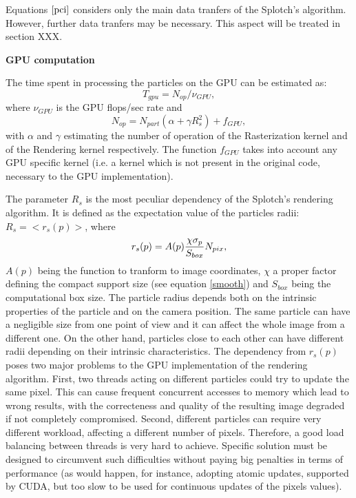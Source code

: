 \documentclass[11pt]{article}
\begin{document}
Equations $\eqref{pci}$ considers only the main data tranfers of
the Splotch's algorithm. However, further data tranfers may be necessary.
This aspect will be treated in section XXX.

\medskip
\noindent
{\bf GPU computation}

The time spent in processing the particles on the GPU can be estimated as:
\begin{equation}
T_{gpu} = N_{op}/\nu_{GPU},
\end{equation}
where $\nu_{GPU}$ is the GPU flops/sec rate and
\begin{equation}\label{ops}
N_{op} = N_{part}(\alpha + \gamma R_s^2) + f_{GPU},
\end{equation}
with $\alpha$ and $\gamma$ estimating the number of operation of 
the Rasterization kernel  
and of the Rendering kernel respectively. The function 
$f_{GPU}$ takes into account any GPU specific kernel (i.e. a kernel
which is not present in the original code, necessary to the GPU implementation). 

The parameter $R_s$ is the most peculiar dependency of the Splotch's rendering
algorithm. It is defined as the expectation value of the particles radii:
$R_s = <r_s(p)>$, where
\begin{equation}\label{radius}
r_s(p) = A(p){\chi \sigma_p\over S_{box}} N_{pix},
\end{equation} 
$A(p)$ being the function to tranform to image coordinates,
$\chi$ a proper factor defining the compact support size (see  
equation \eqref{smooth}) and $S_{box}$ being the computational box size.
The particle radius depends both on the intrinsic properties of the particle
and on the camera position. The same particle can have a negligible size
from one point of view and it can affect the whole image from a different one.
On the other hand, particles close to each other can have different radii depending
on their intrinsic characteristics. The dependency from $r_s(p)$ poses 
two major problems to the GPU implementation of the rendering 
algorithm. First, two threads acting on different particles could try 
to update the same pixel.
This can cause frequent concurrent accesses to memory
which lead to wrong results, with the correcteness and quality of the resulting image 
degraded if not completely compromised.
Second, different particles can require very different workload, affecting 
a different number of pixels. Therefore, a good load balancing
between threads is very hard to achieve.  
Specific solution must be designed to circumvent such difficulties 
without paying big penalties in terms of performance (as would happen, for instance,
adopting atomic updates, supported by CUDA, but too slow to be used for continuous 
updates of the pixels values).
\end{document}

